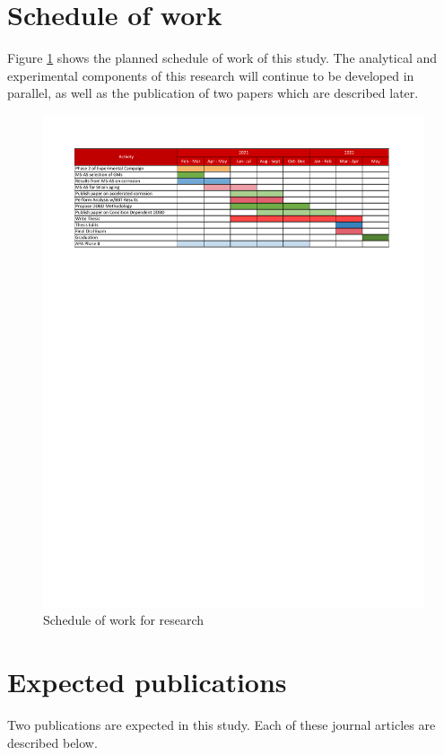 \section{Schedule of work}
Figure \ref{fig:Schedule} shows the planned schedule of work of this study. The analytical and experimental components of this research will continue to be developed in parallel, as well as the publication of two papers which are described later. 
\begin{figure}[htbp]
	\centering
    \includegraphics[width=1.0\textwidth]{VAC Prelim 2.0/Chapter-5/figs/Plan of Research.pdf}
	\caption{Schedule of work for research}
	\label{fig:Schedule}
\end{figure}

\section{Expected publications}

Two publications are expected in this study. Each of these journal articles are described below.

